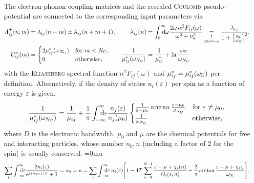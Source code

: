 \documentclass[a4paper]{article}
\def\D{\mathrm d}
\def\E{\mathrm e}
\def\sub#1{\sb{\mathrm{#1}}}
\def\from#1{\sb{\mathrlap{#1}}}
\def\till#1{\sp{\mathrlap{#1}}}
\let\epsilon\varepsilon
\let\Lambda\varLambda
\let\Theta\varTheta
\begin{document}
   The electron-phonon coupling matrices and the rescaled \textsc{Coulomb}
   pseudo-potential are connected to the corresponding input parameters via
   \begin{align}
      \Lambda_{i j}^\pm(n, m) &=
      \lambda_{i j}(n - m) \pm \lambda_{i j}(n + m + 1),
      &
      \lambda_{i j}(n) &=
      \int \from 0 \till \infty \D \omega
      \frac{2 \omega \, \alpha^2 F_{i j}(\omega)}{\omega^2 + \nu_n^2}
      \underset {\underset{\text{Einstein}}\uparrow} =
      \frac{\lambda_{i j}}{1 + \bigl[ \frac{\nu_n}{\omega \sub E} \bigr]^2},
      \notag
      \\
      U^*_{i j}(m) &=
      \begin{cases}
         2 \mu^*_{i j}(\omega_{N \sub C}) & \text{for $m < N \sub C$,} \\
         0                                & \text{otherwise,}
      \end{cases}
      &
      \frac 1 {\mu^*_{i j}(\omega_{N \sub C})} &=
      \frac 1 {\mu^*_{i j}} + \ln \frac{\omega \sub E}{\omega_{N \sub C}}
      \label{cDOS rescaling}
   \end{align}
   with the \textsc{Eliashberg} spectral function $\alpha^2 F_{i j}(\omega)$
   and $\mu^*_{i j} = \mu^*_{i j}(\omega \sub E)$ per definition. Alternatively,
   if the density of states $n_i(\epsilon)$ per spin as a function of energy
   $\epsilon$ is given,
   \begin{equation}
       \frac 1 {\mu^*_{i j}(\omega_{N \sub C})} =
       \frac 1 {\mu_{i j}} +
       \frac 1 \pi \int \from{-\infty} \till \infty \D \epsilon
       \frac{n_j(\epsilon)}{n_j(\mu_0)}
       \begin{cases}
           \frac 1 {\epsilon - \mu_0}
           \arctan \frac{\epsilon - \mu_0}{\omega_{N \sub C}}
               & \text{for $\epsilon \neq \mu_0$,} \\
           \frac 1 {\omega_{N \sub C}}
               & \text{otherwise,}
       \end{cases}
      \label{rescaling}
   \end{equation}
   where $D$ is the electronic bandwidth. $\mu_0$ and $\mu$ are the chemical
   potentials for free and interacting particles, whose number $n_0, n$
   (including a factor of 2 for the spin) is usually conserved:
   \begingroup
   \medmuskip=0mu
   \begin{equation*}
      \sum_i \int \from{-\infty} \till \infty \D \epsilon
      \frac{2 n_i(\epsilon)}{\E^{(\epsilon - \mu_0) / T} + 1}
      = n_0 \overset ! = n
      = \sum_i \int \from{-\infty} \till \infty \D \epsilon \,
      n_i(\epsilon)
      \Biggl[
          1 - 4 T \sum_{n = 0}^{N - 1}
         \frac{\epsilon - \mu + \chi_i(n)}{\Theta_i(\epsilon, n)}
         - \frac 2 \pi \arctan \frac{\epsilon - \mu + {\chi \sub C}_i}{\omega_N}
      \Biggr].
   \end{equation*}
\end{document}
